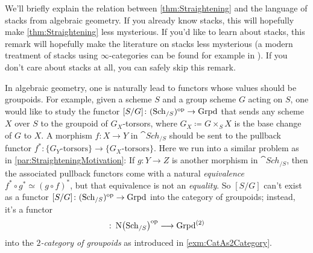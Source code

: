 \begin{numpar}\label{par:Stacks}
	We'll briefly explain the relation between \cref{thm:Straightening} and the language of stacks from algebraic geometry. If you already know stacks, this will hopefully make \cref{thm:Straightening} less mysterious. If you'd like to learn about stacks, this remark will hopefully make the literature on stacks less mysterious (a modern treatment of stacks using $\infty$-categories can be found for example in \cite{KhanStacks}). If you don't care about stacks at all, you can safely skip this remark.
	
	In algebraic geometry, one is naturally lead to functors whose values should be groupoids. For example, given a scheme $S$ and a group scheme $G$ acting on $S$, one would like to study the functor $[S/G]\colon (\mathrm{Sch}_{/S})^{\mathrm{op}}\rightarrow \mathrm{Grpd}$ that sends any scheme $X$ over $S$ to the groupoid of $G_X$-torsors, where $G_X\coloneqq G\times_SX$ is the base change of $G$ to $X$. A morphism $f\colon X\rightarrow Y$ in $\cat{Sch}_{/S}$ should be sent to the pullback functor $f^*\colon \{G_Y\text{-torsors}\}\rightarrow \{G_X\text{-torsors}\}$. Here we run into a similar problem as in \cref{par:StraighteningMotivation}: If $g\colon Y\rightarrow Z$ is another morphism in $\cat{Sch}_{/S}$, then the associated pullback functors come with a natural \emph{equivalence} $f^*\circ g^*\simeq (g\circ f)^*$, but that equivalence is not an \emph{equality}. So $[S/G]$ can't exist as a functor $[S/G]\colon (\mathrm{Sch}_{/S})^{\mathrm{op}}\rightarrow \mathrm{Grpd}$ into the category of groupoids; instead, it's a functor
	\begin{equation*}
		[S/G]\colon \N\left(\cat{Sch}_{/S}\right)^\op\longrightarrow \cat{Grpd}^{(2)}
	\end{equation*}
	into the \emph{$2$-category of groupoids} as introduced in \cref{exm:CatAs2Category}.
	

\end{numpar}
